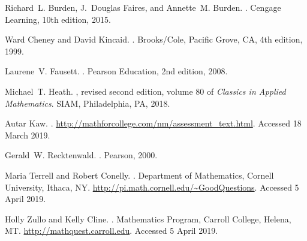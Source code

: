 \documentclass[10pt]{article}
\begin{document}
\newpage
%
%
\begin{thebibliography}{1}

Richard~L. Burden, J.~Douglas Faires, and Annette~M. Burden.
.
\newblock Cengage Learning, 10th edition, 2015.

Ward Cheney and David Kincaid.
. 
\newblock Brooks/Cole, Pacific Grove, CA, 4th edition, 1999.

Laurene~V. Fausett. 
. 
\newblock Pearson Education, 2nd edition, 2008.


Michael~T. Heath.
, 
revised second edition, volume 80 of {\em Classics in Applied Mathematics}.
\newblock SIAM, Philadelphia, PA, 2018.

Autar Kaw. 
.
\newblock \url{http://mathforcollege.com/nm/assessment_text.html}.
Accessed 18 March 2019.


Gerald~W. Recktenwald.
. 
\newblock Pearson, 2000.

Maria Terrell and Robert Conelly.
.
Department of Mathematics, Cornell University, Ithaca, NY.
\newblock \url{http://pi.math.cornell.edu/~GoodQuestions}.
Accessed 5 April 2019.

Holly Zullo and Kelly Cline.
.  
Mathematics Program, Carroll College, Helena, MT.
\newblock \url{http://mathquest.carroll.edu}.  
Accessed 5 April 2019.

\label{last-page}

\end{thebibliography}
\end{document}
